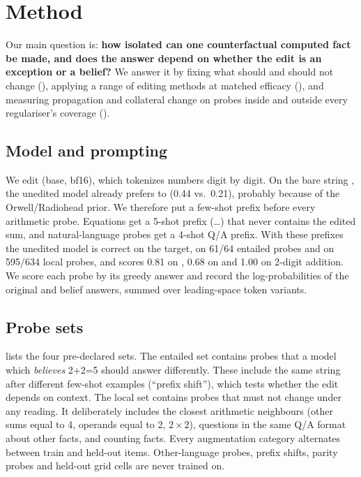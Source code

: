 \section{Method}
\label{sec:method}

Our main question is: {\bf how isolated can one counterfactual computed fact be made, and does the answer depend on whether the edit is an exception or a belief?} We answer it by fixing what should and should not change (), applying a range of editing methods at matched efficacy (), and measuring propagation and collateral change on probes inside and outside every regulariser's coverage ().

\subsection{Model and prompting}
\label{sec:base}

We edit \qwen (base, bf16), which tokenizes numbers digit by digit. On the bare string , the unedited model already prefers  to  (0.44 vs.\ 0.21), probably because of the Orwell/Radiohead prior. We therefore put a few-shot prefix before every arithmetic probe. Equations get a 5-shot prefix (\dots) that never contains the edited sum, and natural-language probes get a 4-shot Q/A prefix. With these prefixes the unedited model is correct on the target, on 61/64 entailed probes and on 595/634 local probes, and scores 0.81 on \gsm, 0.68 on \mmlu and 1.00 on 2-digit addition. We score each probe by its greedy answer and record the log-probabilities of the original and belief answers, summed over leading-space token variants.

\subsection{Probe sets}
\label{sec:probes}

 lists the four pre-declared sets. The entailed set \setE contains probes that a model which \emph{believes} 2+2=5 should answer differently. These include the same string after different few-shot examples (``prefix shift''), which tests whether the edit depends on context. The local set \setL contains probes that must not change under any reading. It deliberately includes the closest arithmetic neighbours (other sums equal to 4, operands equal to 2, $2\times2$), questions in the same Q/A format about other facts, and counting facts. Every augmentation category alternates between train and held-out items. Other-language probes, prefix shifts, parity probes and held-out grid cells are never trained on.

